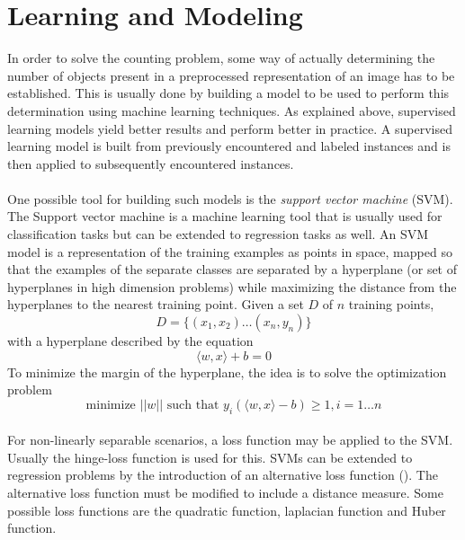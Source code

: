 \section{Learning and Modeling}
In order to solve the counting problem, some way of actually determining the number of objects present in a preprocessed representation of an image has to be established. This is usually done by building a model to be used to perform this determination using machine learning techniques. As explained above, supervised learning models yield better results and perform better in practice. A supervised learning model is built from previously encountered and labeled instances and is then applied to subsequently encountered instances.\\ \\
%
One possible tool for building such models is the \textit{support vector machine} (SVM). The Support vector machine is a machine learning tool that is usually used for classification tasks but can be extended to regression tasks as well. An SVM model is a representation of the training examples as points in space, mapped so that the examples of the separate classes are separated by a hyperplane (or set of hyperplanes in high dimension problems) while maximizing the distance from the hyperplanes to the nearest training point. Given a set $D$ of $n$ training points, 
\begin{equation}
D = \{(x_1, x_2)  \ldots  (x_n, y_n)\}
\end{equation}
with a hyperplane described by the equation
\begin{equation}
\langle w,x \rangle + b = 0
\end{equation}
To minimize the margin of the hyperplane, the idea is to solve the optimization problem
\begin{equation}
\text{minimize }||w||\text{ such that }y_i(\langle w,x \rangle - b) \ge 1, i = 1  \ldots  n 
\end{equation}\\
%
For non-linearly separable scenarios, a loss function may be applied to the SVM. Usually the hinge-loss function is used for this. SVMs can be extended to regression problems by the introduction of an alternative loss function (\cite{REF19}). The alternative loss function must be modified to include a distance measure. Some possible loss functions are the quadratic function, laplacian function and Huber function.\\ \\
%
